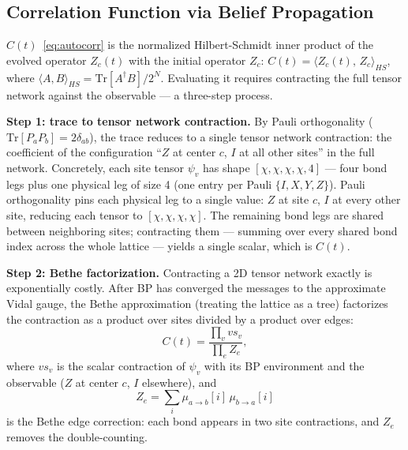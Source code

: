 \documentclass[11pt]{article}
\begin{document}
\subsection{Correlation Function via Belief Propagation}

$C(t)$~\eqref{eq:autocorr} is the normalized Hilbert-Schmidt inner product of
the evolved operator $Z_c(t)$ with the initial operator $Z_c$:
$C(t) = \langle Z_c(t),\, Z_c \rangle_{HS}$, where
$\langle A, B\rangle_{HS} = \mathrm{Tr}[A^\dagger B]/2^N$.
Evaluating it requires contracting the full tensor network against the observable —
a three-step process.

\textbf{Step 1: trace to tensor network contraction.}
By Pauli orthogonality ($\mathrm{Tr}[P_a P_b] = 2\delta_{ab}$), the trace
reduces to a single tensor network contraction: the coefficient of the
configuration ``$Z$ at center $c$, $I$ at all other sites'' in the full network.
Concretely, each site tensor $\psi_v$ has shape $[\chi,\chi,\chi,\chi,4]$ ---
four bond legs plus one physical leg of size 4 (one entry per Pauli $\{I,X,Y,Z\}$).
Pauli orthogonality pins each physical leg to a single value: $Z$ at site $c$,
$I$ at every other site, reducing each tensor to $[\chi,\chi,\chi,\chi]$.
The remaining bond legs are shared between neighboring sites; contracting them ---
summing over every shared bond index across the whole lattice --- yields a single
scalar, which is $C(t)$.

\textbf{Step 2: Bethe factorization.}
Contracting a 2D tensor network exactly is exponentially costly.
After BP has converged the messages to the approximate Vidal gauge, the
Bethe approximation (treating the lattice as a tree) factorizes the contraction
as a product over sites divided by a product over edges:
\begin{equation}
  C(t) = \frac{\displaystyle\prod_v vs_v}{\displaystyle\prod_e Z_e},
  \label{eq:bethe_raw}
\end{equation}
where $vs_v$ is the scalar contraction of $\psi_v$ with its BP environment and
the observable ($Z$ at center $c$, $I$ elsewhere), and
\begin{equation}
  Z_e = \sum_i \mu_{a \to b}[i]\, \mu_{b \to a}[i]
  \label{eq:ze}
\end{equation}
is the Bethe edge correction: each bond appears in two site contractions, and
$Z_e$ removes the double-counting.
\end{document}
